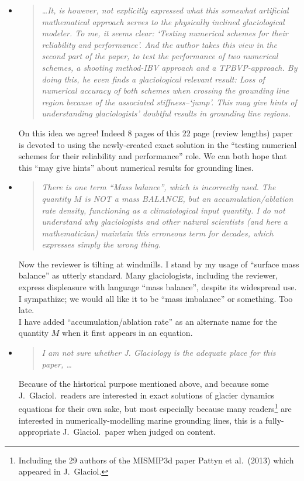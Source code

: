 \documentclass[11pt,reqno]{amsart}
\newcommand{\reply}[2]{
\medskip\medskip
\item  \begin{quote}
\emph{#1}
\end{quote}

\medskip
\noindent #2}
\begin{document}
\begin{itemize}
\reply{\dots It, is however, not explicitly expressed what this somewhat artificial mathematical approach serves to the physically inclined glaciological modeler. To me, it seems clear: `Testing numerical schemes for their reliability and performance'. And the author takes this view in the second part of the paper, to test the performance of two numerical schemes, a shooting method-IBV approach and a TPBVP-approach. By doing this, he even finds a glaciological relevant result: Loss of numerical accuracy of both schemes when crossing the grounding line region because of the associated stiffness--`jump'.  This may give hints of understanding glaciologists' doubtful results in grounding line regions.}
{On this idea we agree!  Indeed 8 pages of this 22 page (review lengths) paper is devoted to using the newly-created exact solution in the ``testing numerical schemes for their reliability and performance'' role.  We can both hope that this ``may give hints'' about numerical results for grounding lines.}

\reply{There is one term ``Mass balance'', which is incorrectly used. The quantity $M$ is NOT a mass BALANCE, but an accumulation/ablation rate density, functioning as a climatological input quantity. I do not understand why glaciologists and other natural scientists (and here a mathematician) maintain this erroneous term for decades, which expresses simply the wrong thing.}
{Now the reviewer is tilting at windmills.  I stand by my usage of ``surface mass balance'' as utterly standard.  Many glaciologists, including the reviewer, express displeasure with language ``mass balance'', despite its widespread use.  I sympathize; we would all like it to be ``mass imbalance'' or something.  Too late. \medskip \\
I have added ``accumulation/ablation rate'' as an alternate name for the quantity $M$ when it first appears in an equation.}

\reply{I am not sure whether J. Glaciology is the adequate place for this paper, \dots}
{Because of the historical purpose mentioned above, and because some J.~Glaciol.~readers are interested in exact solutions of glacier dynamics equations for their own sake, but most especially because many readers\footnote{  Including the 29 authors of the MISMIP3d paper Pattyn et al.~(2013) which appeared in J.~Glaciol.} are interested in numerically-modelling marine grounding lines, this is a fully-appropriate J.~Glaciol.~paper when judged on content.}


\end{itemize}
\end{document}
